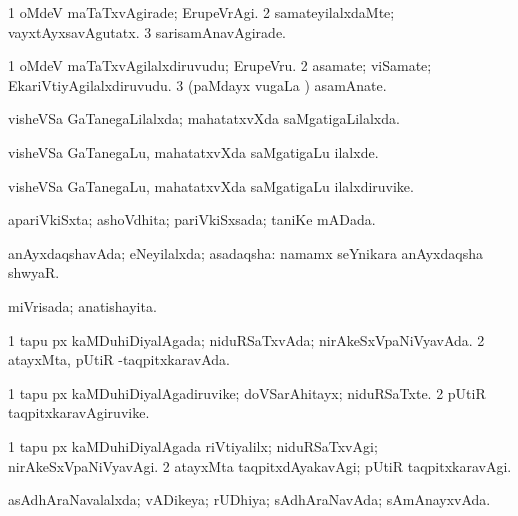 \bentry
{} 
\gl{\kirxvi}
\expl{}
\bmng
\bnum
\num{1} oMdeV maTaTxvAgirade; ErupeVrAgi. 
\num{2} samateyilalxdaMte; vayxtAyxsavAgutatx. 
\num{3} sarisamAnavAgirade. 
\enum
\emng
\eentry

\bentry
{} 
\gl{\nA}
\expl{}
\bmng
\bnum
\num{1} oMdeV maTaTxvAgilalxdiruvudu; ErupeVru. 
\num{2} asamate; viSamate; EkariVtiyAgilalxdiruvudu. 
\num{3} (paMdayx \mo vugaLa \vi) asamAnate. 
\enum
\emng
\eentry

\bentry
{} 
\gl{\gu}
\expl{}
\bmng
 visheVSa GaTanegaLilalxda; mahatatxvXda saMgatigaLilalxda. 
\emng
\eentry

\bentry
{} 
\gl{\kirxvi}
\expl{}
\bmng
 visheVSa GaTanegaLu, mahatatxvXda saMgatigaLu ilalxde. 
\emng
\eentry

\bentry
{} 
\gl{\nA}
\expl{}
\bmng
 visheVSa GaTanegaLu, mahatatxvXda saMgatigaLu ilalxdiruvike. 
\emng
\eentry

\bentry
{} 
\gl{\gu}
\expl{}
\bmng
 apariVkiSxta; ashoVdhita; pariVkiSxsada; taniKe mADada. 
\emng
\eentry

\bentry
{} 
\gl{\gu}
\expl{}
\bmng
 anAyxdaqshavAda; eNeyilalxda; asadaqsha:  namamx seYnikara anAyxdaqsha shwyaR. 
\emng
\eentry

\bentry
{} 
\gl{\gu}
\expl{}
\bmng
 miVrisada; anatishayita. 
\emng
\eentry

\bentry
{} 
\gl{\gu}
\expl{}
\bmng
\bnum
\num{1} tapu px kaMDuhiDiyalAgada; niduRSaTxvAda; nirAkeSxVpaNiVyavAda. 
\num{2} atayxMta, pUtiR -taqpitxkaravAda. 
\enum
\emng
\eentry

\bentry
{} 
\gl{\nA}
\expl{}
\bmng
\bnum
\num{1} tapu px kaMDuhiDiyalAgadiruvike; doVSarAhitayx; niduRSaTxte. 
\num{2} pUtiR taqpitxkaravAgiruvike. 
\enum
\emng
\eentry

\bentry
{} 
\gl{\kirxvi}
\expl{}
\bmng
\bnum
\num{1} tapu px kaMDuhiDiyalAgada riVtiyalilx; niduRSaTxvAgi; nirAkeSxVpaNiVyavAgi. 
\num{2} atayxMta taqpitxdAyakavAgi; pUtiR taqpitxkaravAgi. 
\enum
\emng
\eentry

\bentry
{} 
\gl{\gu}
\expl{}
\bmng
 asAdhAraNavalalxda; vADikeya; rUDhiya; sAdhAraNavAda; sAmAnayxvAda. 
\emng
\eentry

